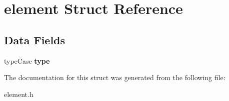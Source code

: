 \hypertarget{structelement}{\section{element Struct Reference}
\label{structelement}
}
\subsection*{Data Fields}
\begin{DoxyCompactItemize}
\item 
\hypertarget{structelement_ae8958a294110f48590d1db3b2cbe9783}{type\-Case {\bfseries type}}\label{structelement_ae8958a294110f48590d1db3b2cbe9783}

\end{DoxyCompactItemize}


The documentation for this struct was generated from the following file\-:\begin{DoxyCompactItemize}
\item 
element.\-h\end{DoxyCompactItemize}
